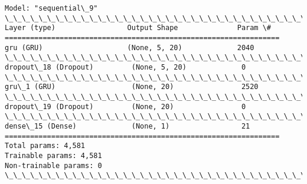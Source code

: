 \documentclass[11pt]{article}
\begin{document}
    \begin{Verbatim}[commandchars=\\\{\}]
Model: "sequential\_9"
\_\_\_\_\_\_\_\_\_\_\_\_\_\_\_\_\_\_\_\_\_\_\_\_\_\_\_\_\_\_\_\_\_\_\_\_\_\_\_\_\_\_\_\_\_\_\_\_\_\_\_\_\_\_\_\_\_\_\_\_\_\_\_\_\_
Layer (type)                 Output Shape              Param \#
=================================================================
gru (GRU)                    (None, 5, 20)             2040
\_\_\_\_\_\_\_\_\_\_\_\_\_\_\_\_\_\_\_\_\_\_\_\_\_\_\_\_\_\_\_\_\_\_\_\_\_\_\_\_\_\_\_\_\_\_\_\_\_\_\_\_\_\_\_\_\_\_\_\_\_\_\_\_\_
dropout\_18 (Dropout)         (None, 5, 20)             0
\_\_\_\_\_\_\_\_\_\_\_\_\_\_\_\_\_\_\_\_\_\_\_\_\_\_\_\_\_\_\_\_\_\_\_\_\_\_\_\_\_\_\_\_\_\_\_\_\_\_\_\_\_\_\_\_\_\_\_\_\_\_\_\_\_
gru\_1 (GRU)                  (None, 20)                2520
\_\_\_\_\_\_\_\_\_\_\_\_\_\_\_\_\_\_\_\_\_\_\_\_\_\_\_\_\_\_\_\_\_\_\_\_\_\_\_\_\_\_\_\_\_\_\_\_\_\_\_\_\_\_\_\_\_\_\_\_\_\_\_\_\_
dropout\_19 (Dropout)         (None, 20)                0
\_\_\_\_\_\_\_\_\_\_\_\_\_\_\_\_\_\_\_\_\_\_\_\_\_\_\_\_\_\_\_\_\_\_\_\_\_\_\_\_\_\_\_\_\_\_\_\_\_\_\_\_\_\_\_\_\_\_\_\_\_\_\_\_\_
dense\_15 (Dense)             (None, 1)                 21
=================================================================
Total params: 4,581
Trainable params: 4,581
Non-trainable params: 0
\_\_\_\_\_\_\_\_\_\_\_\_\_\_\_\_\_\_\_\_\_\_\_\_\_\_\_\_\_\_\_\_\_\_\_\_\_\_\_\_\_\_\_\_\_\_\_\_\_\_\_\_\_\_\_\_\_\_\_\_\_\_\_\_\_
    \end{Verbatim}
\end{document}
